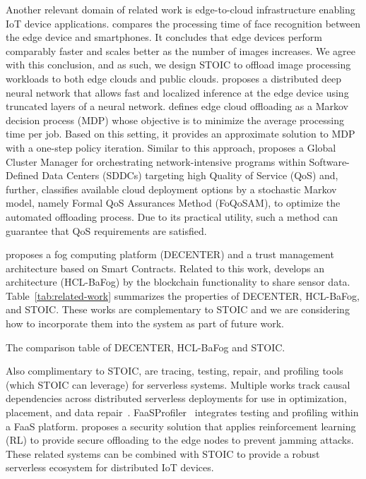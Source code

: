 Another relevant domain of related work is edge-to-cloud 
infrastructure enabling IoT device applications. 
\cite{ref:face} compares the processing time of face recognition 
between the edge device and smartphones.  It concludes that edge
devices perform comparably faster and scales better as the number of images
increases. We agree with this conclusion, and as such, we design STOIC to offload
image processing workloads to both edge clouds and public clouds.
\cite{ref:DDNN} proposes a distributed deep neural network that allows fast and
localized inference at the edge device using truncated layers of a neural
network. \cite{ref:cooperative} defines edge cloud offloading as a Markov
decision process (MDP) whose objective is to minimize the average processing
time per job. Based on this setting, it provides an approximate solution to
MDP with a one-step policy iteration. Similar to this approach,
\cite{ref:QoS-aware} proposes a Global Cluster Manager for orchestrating
network-intensive programs within Software-Defined Data Centers (SDDCs)
targeting high Quality of Service (QoS) and, further, \cite{ref:FQoS} classifies
available cloud deployment options by a stochastic Markov model, namely Formal
QoS Assurances Method (FoQoSAM), to optimize the automated offloading process.
Due to its practical utility, such a method can guarantee that 
QoS requirements are satisfied.

\cite{ref:trust} proposes a fog computing platform (DECENTER) and a trust
management architecture based on Smart Contracts. Related to this work,
\cite{ref:multichain} develops an architecture (HCL-BaFog) by the blockchain
functionality to share sensor data. Table~\ref{tab:related-work} summarizes the
properties of DECENTER, HCL-BaFog, and STOIC. These works are complementary to
STOIC and we are considering how to incorporate them into the system as part of
future work.

\begin{table}
\centering
\resizebox{390pt}{!}{
}
\caption{ The comparison table of DECENTER, HCL-BaFog and STOIC.
\label{tab:related-work}}
\end{table}

Also complimentary to STOIC, are tracing, testing, repair, and profiling tools
(which STOIC can leverage) for serverless systems. Multiple works track causal
dependencies across distributed serverless deployments for use in optimization,
placement, and data
repair~\cite{ref:repairdata,deptracing19,gammaray17,aws-xray}.
FaaSProfiler~\cite{ref:profile} integrates testing and profiling 
within a FaaS platform. \cite{ref:security} proposes a security solution that
applies reinforcement learning (RL) to provide secure offloading to the edge
nodes to prevent jamming attacks. These related systems can be combined with
STOIC to provide a robust serverless ecosystem for distributed IoT devices.

